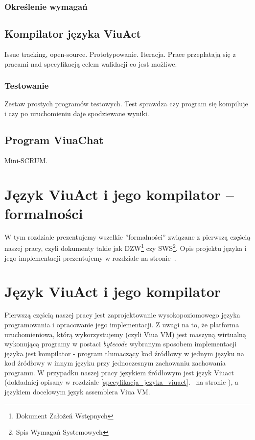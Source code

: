 \documentclass[11pt,oneside,a4paper,titlepage,onecolumn]{book}
\begin{document}
\subsection{Określenie wymagań}

\section{Kompilator języka ViuAct}

Issue tracking, open-source. Prototypowanie. Iteracja.
Prace przeplatają się z pracami nad specyfikacją celem walidacji co jest możliwe.

\subsection{Testowanie}

Zestaw prostych programów testowych. Test sprawdza czy program się kompiluje i czy po uruchomieniu daje
spodziewane wyniki.

\section{Program ViuaChat}

Mini-SCRUM.

\chapter{Język ViuAct i jego kompilator -- formalności}

W tym rozdziale prezentujemy wszelkie ''formalności'' związane z pierwszą częścią naszej pracy, czyli
dokumenty takie jak DZW\footnote{Dokument Założeń Wstępnych} czy SWS\footnote{Spis Wymagań Systemowych}.
Opis projektu języka i jego implementacji prezentujemy w rozdziale  na
stronie~\pageref{jezyk_viuact_i_jego_kompilator}.



\chapter{Język ViuAct i jego kompilator}
\label{jezyk_viuact_i_jego_kompilator}

Pierwszą częścią naszej pracy jest zaprojektowanie wysokopoziomowego języka programowania i opracowanie jego
implementacji. Z uwagi na to, że platforma uruchomieniowa, którą wykorzystujemy (czyli Viua VM) jest maszyną
wirtualną wykonującą programy w postaci \emph{bytecode} wybranym sposobem implementacji języka jest
kompilator - program tłumaczący kod źródłowy w jednym języku na kod źródłowy w innym języku przy jednoczesnym
zachowaniu zachowania programu. W przypadku naszej pracy językiem źródłowym jest język Viuact (dokładniej
opisany w rozdziale \ref{specyfikacja_jezyka_viuact}.~ na stronie
\pageref{specyfikacja_jezyka_viuact}), a językiem docelowym język assemblera Viua VM.
\end{document}
